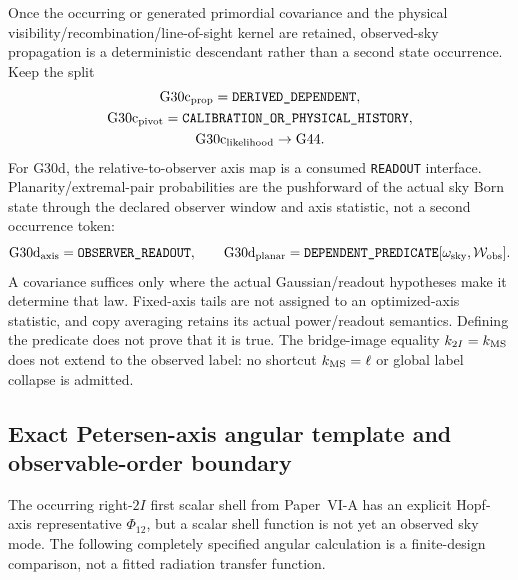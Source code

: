 \documentclass[12pt,a4paper]{article}
\begin{document}
\begin{remark}
Once the occurring or generated primordial covariance and the physical
visibility/recombination/line-of-sight kernel are retained, observed-sky
propagation is a deterministic descendant rather than a second state
occurrence.  Keep the split
\[
 \begin{gathered}
 \mathrm{G30c}_{\rm prop}=\texttt{DERIVED\_DEPENDENT},\\
 \mathrm{G30c}_{\rm pivot}=\texttt{CALIBRATION\_OR\_PHYSICAL\_HISTORY},\\
 \mathrm{G30c}_{\rm likelihood}\to\mathrm{G44}.
 \end{gathered}
\]
For G30d, the relative-to-observer axis map is a consumed
\texttt{READOUT} interface. Planarity/\allowbreak extremal-pair probabilities are the
pushforward of the actual sky Born state through the declared observer window
and axis statistic, not a second occurrence token:
\[
 \mathrm{G30d}_{\rm axis}=\texttt{OBSERVER\_READOUT},\qquad
 \mathrm{G30d}_{\rm planar}
 =\texttt{DEPENDENT\_PREDICATE}[\omega_{\rm sky},\mathcal W_{\rm obs}].
\]
A covariance suffices only where the actual Gaussian/readout hypotheses make
it determine that law.  Fixed-axis tails are not assigned to an optimized-axis
statistic, and copy averaging retains its actual power/readout semantics.
Defining the predicate does not prove that it is true.  The bridge-image equality $k_{2I}=k_{\rm MS}$ does
not extend to the observed label: no shortcut $k_{\rm MS}=\ell$ or global
label collapse is admitted.
\end{remark}





\subsection{Exact Petersen-axis angular template and observable-order boundary}
\label{p6b:sec:v322-petersen-angular-test}
The occurring right-$2I$ first scalar shell from Paper~VI-A has an
explicit Hopf-axis representative $\Phi_{12}$, but a scalar shell function
is not yet an observed sky mode.  The following completely specified
angular calculation is a finite-design comparison, not a fitted radiation
transfer function.
\end{document}
